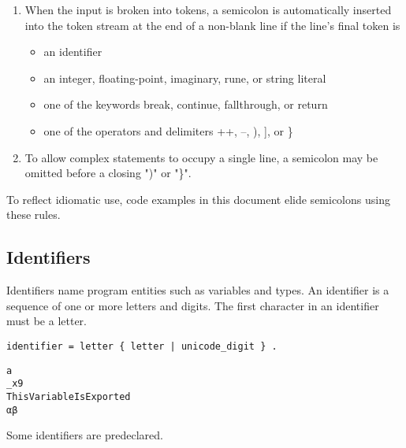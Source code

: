 \documentclass{article}
\begin{document}
\begin{enumerate}

  \item When the input is broken into tokens, a semicolon is
  automatically inserted into the token stream at the end of a
  non-blank line if the line's final token is

  \begin{itemize}

    \item an identifier

    \item an integer, floating-point, imaginary, rune, or string
    literal

    \item one of the keywords break, continue, fallthrough, or
    return

    \item one of the operators and delimiters ++, --, ), ], or \}
  \end{itemize}

  \item To allow complex statements to occupy a single line, a
  semicolon may be omitted before a closing ")" or "\}".

\end{enumerate}

To reflect idiomatic use, code examples in this document elide
semicolons using these rules.

\subsection*{Identifiers}
Identifiers name program entities such as variables and types. An
identifier is a sequence of one or more letters and digits. The
first character in an identifier must be a letter.

\begin{Verbatim}[frame=single]
identifier = letter { letter | unicode_digit } .
\end{Verbatim}

\begin{Verbatim}[frame=single]
a
_x9
ThisVariableIsExported
αβ
\end{Verbatim}

Some identifiers are predeclared.
\end{document}
